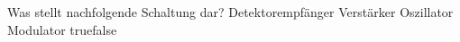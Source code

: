     {Was stellt nachfolgende Schaltung dar?}
    {Detektorempfänger}
    {Verstärker}
    {Oszillator}
    {Modulator}
    {true}{false}